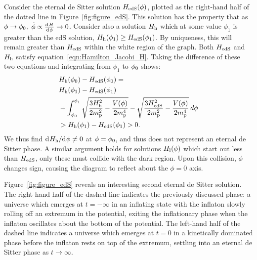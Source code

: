 Consider the eternal de Sitter solution \(H_\mathrm{edS}(\phi)\), plotted as the right-hand half of the dotted line in Figure~\ref{fig:figure_edS}.  This solution has the property that as \(\phi\to\phi_0\), \(\dot{\phi}\propto\frac{\operatorname{d}^{}\!{H}}{\operatorname{d}^{}\!{\phi}}\to0\). Consider also a solution \(H_\mathrm{h}\) which at some value \(\phi_1\) is greater than the edS solution, \(H_\mathrm{h}(\phi_1) \ge H_\mathrm{edS}(\phi_1)\). By uniqueness, this will remain greater than \(H_\mathrm{edS}\) within the white region of the graph. Both \(H_\mathrm{edS}\) and \(H_\mathrm{h}\) satisfy equation~\eqref{eqn:Hamilton_Jacobi_H}.  Taking the difference of these two equations and integrating from \(\phi_1\) to \(\phi_0\) shows:
\begin{align}
  &H_\mathrm{h}(\phi_0)-H_\mathrm{edS}(\phi_0)= \nonumber\\
  &H_\mathrm{h}(\phi_1)-H_\mathrm{edS}(\phi_1) \nonumber\\
  & + \int_{\phi_0}^{\phi_1} 
  \sqrt{\frac{3H_\mathrm{h}^2}{2m_{\mathrm{p}}^2} - 
  \frac{V(\phi)}{2m_{\mathrm{p}}^4}}-\sqrt{\frac{3H_\mathrm{edS}^2}{2m_{\mathrm{p}}^2} - 
  \frac{V(\phi)}{2m_{\mathrm{p}}^4}}\:d\phi \nonumber \\
  &>H_\mathrm{h}(\phi_1)-H_\mathrm{edS}(\phi_1)>0.
\end{align}
We thus find \({\operatorname{d}^{}\!{H_\mathrm{h}}}/{\operatorname{d}^{}\!{\phi}}\ne0\) at \(\phi=\phi_0\), and thus does not represent an eternal de Sitter phase. A similar argument holds for solutions \(H_\mathrm{l}(\phi)\) which start out less than \(H_\mathrm{edS}\), only these must collide with the dark region. Upon this collision, \(\dot{\phi}\) changes sign, causing the diagram to reflect about the \(\phi=0\) axis.

Figure~\ref{fig:figure_edS} reveals an interesting second eternal de Sitter solution. The right-hand half of the dashed line indicates the previously discussed phase: a universe which emerges at \(t=-\infty\) in an inflating state with the inflaton slowly rolling off an extremum in the potential, exiting the inflationary phase when the inflaton oscillates about the bottom of the potential.  The left-hand half of the dashed line indicates a universe which emerges at \(t=0\) in a kinetically dominated phase before the inflaton rests on top of the extremum, settling into an eternal de Sitter phase as \(t\to\infty\).

